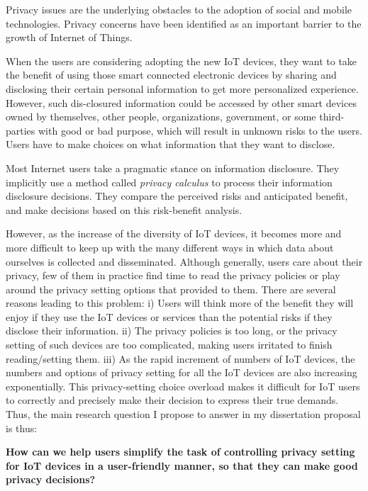 Privacy issues are the underlying obstacles to the adoption of social and mobile technologies. Privacy concerns have been identified as an important barrier to the growth of Internet of Things. 

When the users are considering adopting the new IoT devices, they want to take the benefit of using those smart connected electronic devices by sharing and disclosing their certain personal information to get more personalized experience. However, such dis-closured information could be accessed by other smart devices owned by themselves, other people, organizations, government, or some third-parties with good or bad purpose, which will result in unknown risks to the users. Users have to make choices on what information that they want to disclose.

Most Internet users take a pragmatic stance on information disclosure. They implicitly use a method called \textit{privacy calculus} to process their information disclosure decisions. They compare the perceived risks and anticipated benefit, and make decisions based on this risk-benefit analysis.

However, as the increase of the diversity of IoT devices, it becomes more and more difficult to keep up with the many different ways in which data about ourselves is collected and disseminated. Although generally, users care about their privacy, few of them in practice find time to read the privacy policies or play around the privacy setting options that provided to them. There are several reasons leading to this problem: i) Users will think more of the benefit they will enjoy if they use the IoT devices or services than the potential risks if they disclose their information. ii) The privacy policies is too long, or the privacy setting of such devices are too complicated, making users irritated to finish reading/setting them. iii) As the rapid increment of numbers of IoT devices, the numbers and options of privacy setting for all the IoT devices are also increasing exponentially. This privacy-setting choice overload makes it difficult for IoT users to correctly and precisely make their decision to express their true demands. Thus, the main research question I propose to answer in my dissertation proposal is thus:

\textbf{How can we help users simplify the task of controlling privacy setting for IoT devices in a user-friendly manner, so that they can make good privacy decisions?}